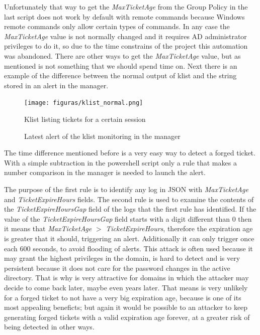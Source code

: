 
\linej
Unfortunately that way to get the \textit{MaxTicketAge} from the Group Policy in the last script does not work by default with remote commands because Windows remote commands only allow certain types of commands.
In any case the \textit{MaxTicketAge} value is not normally changed and it requires AD administrator privileges to do it, so due to the time constrains of the project this automation was abandoned. There are other ways to get the \textit{MaxTicketAge} value, but as mentioned is not something that we should spend time on.
\linej
\linej
Next there is an example of the difference between the normal output of klist and the string stored in an alert in the manager.

\begin{figure}[H]
	\centering
	\texttt{[image: figuras/klist\_normal.png]}
	\caption{Klist listing tickets for a certain session}
\end{figure}
\begin{figure}[H]
	\centering
	\caption{Latest alert of the klist monitoring in the manager}
\end{figure}
\linej
The time difference mentioned before is a very easy way to detect a forged ticket. With a simple subtraction in the powershell script only a rule that makes a number comparison in the manager is needed to launch the alert.
\linej

\linej
The purpose of the first rule is to identify any log in JSON with \textit{MaxTicketAge} and \textit{TicketExpireHours} fields. The second rule is used to examine the contents of the \textit{TicketExpireHoursGap} field of the logs that the first rule has identified. If the value of the \textit{TicketExpireHoursGap} field starts with a digit different than 0 then it means that \textit{MaxTicketAge} $>$ \textit{TicketExpireHours}, therefore the expiration age is greater that it should, triggering an alert.
Additionally it can only trigger once each 600 seconds, to avoid flooding of alerts.
\linej
\linej
This attack is often used because it may grant the highest privileges in the domain, is hard to detect and is very persistent because it does not care for the password changes in the active directory. That is why is very attractive for domains in which the attacker may decide to come back later, maybe even years later. That means is very unlikely for a forged ticket to not have a very big expiration age, because is one of its most appealing beneficts; but again it would be possible to an attacker to keep generating forged tickets with a valid expiration age forever, at a greater risk of being detected in other ways.
